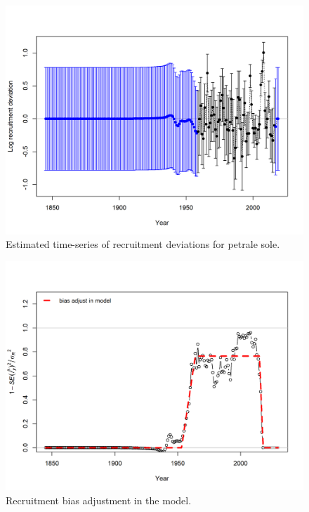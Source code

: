 \documentclass[12pt,]{article}
\begin{document}
\FloatBarrier

\begin{figure}
\centering
\includegraphics{r4ss/plots_mod1/recdevs2_withbars.png}
\caption{Estimated time-series of recruitment deviations for petrale
sole. \label{fig:recdevs}}
\end{figure}

\FloatBarrier

\begin{figure}
\centering
\includegraphics{r4ss/plots_mod1/recruit_fit_bias_adjust.png}
\caption{Recruitment bias adjustment in the model.
\label{fig:bias_adjust}}
\end{figure}
\end{document}
